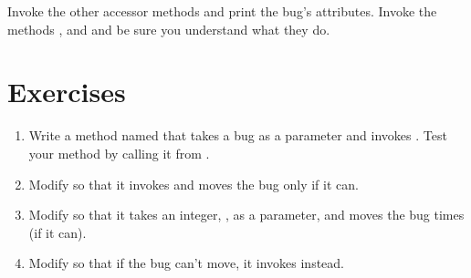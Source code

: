 Invoke the other accessor methods and print the bug's attributes.
Invoke the methods ,  and  and be sure you understand what they do.


\section{Exercises}


\begin{exercise}

\begin{enumerate}

\item Write a method named  that takes a bug as a parameter and invokes .
Test your method by calling it from .

\item Modify  so that it invokes  and moves the bug only if it can.

\item Modify  so that it takes an integer, , as a parameter, and moves the bug  times (if it can).

\item Modify  so that if the bug can't move, it invokes  instead.

\end{enumerate}
\end{exercise}


